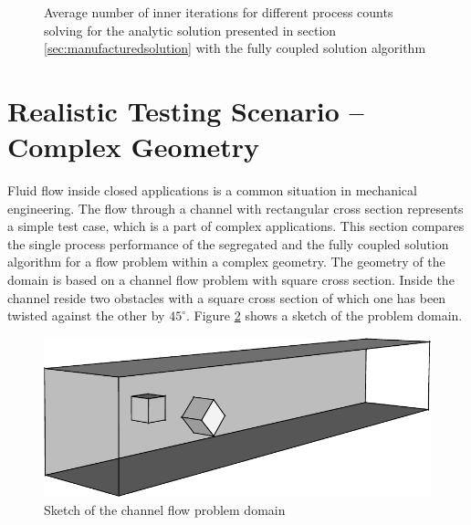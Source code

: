 \begin{figure}[h!]
  \begin{center}
  \end{center}
  \caption{Average number of inner iterations for different process counts solving for the analytic solution presented in section \ref{sec:manufacturedsolution} with the fully coupled solution algorithm}
  \label{fig:weakinner}
\end{figure}

\section{Realistic Testing Scenario -- Complex Geometry}
\label{sec:channel}

Fluid flow inside closed applications is a common situation in mechanical engineering. The flow through a channel with rectangular cross section represents a simple test case, which is a part of complex applications. This section compares the single process performance of the segregated and the fully coupled solution algorithm for a flow problem within a complex geometry. The geometry of the domain is based on a channel flow problem with square cross section. Inside the channel reside two obstacles with a square cross section of which one has been twisted against the other by \(45^{\circ} \). Figure \ref{fig:sketch} shows a sketch of the problem domain. 

\begin{figure}
  \centering
  \includegraphics{./img/channel3d.pdf}
  \caption{Sketch of the channel flow problem domain}
  \label{fig:sketch}
\end{figure}

